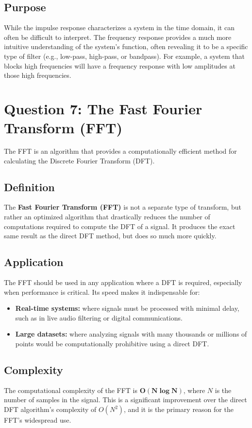 \documentclass[a4paper,12pt]{article}
\begin{document}
\subsection*{Purpose}
While the impulse response characterizes a system in the time domain, it can often be difficult to interpret. The frequency response provides a much more intuitive understanding of the system's function, often revealing it to be a specific type of filter (e.g., low-pass, high-pass, or bandpass). For example, a system that blocks high frequencies will have a frequency response with low amplitudes at those high frequencies.


\section{Question 7: The Fast Fourier Transform (FFT)}
The FFT is an algorithm that provides a computationally efficient method for calculating the Discrete Fourier Transform (DFT).

\subsection*{Definition}
The \textbf{Fast Fourier Transform (FFT)} is not a separate type of transform, but rather an optimized algorithm that drastically reduces the number of computations required to compute the DFT of a signal. It produces the exact same result as the direct DFT method, but does so much more quickly.

\subsection*{Application}
The FFT should be used in any application where a DFT is required, especially when performance is critical. Its speed makes it indispensable for:
\begin{itemize}
    \item \textbf{Real-time systems:} where signals must be processed with minimal delay, such as in live audio filtering or digital communications.
    \item \textbf{Large datasets:} where analyzing signals with many thousands or millions of points would be computationally prohibitive using a direct DFT.
\end{itemize}

\subsection*{Complexity}
The computational complexity of the FFT is $\mathbf{O(N \log N)}$, where $N$ is the number of samples in the signal. This is a significant improvement over the direct DFT algorithm's complexity of $O(N^2)$, and it is the primary reason for the FFT's widespread use.
\end{document}
